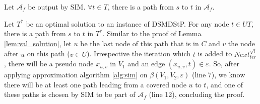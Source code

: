 \begin{Lem}
  \label{lem:terminals_covered}
  Let $\mathcal{A}_f$ be output by SIM. $\forall t \in T$, there is a path from $s$ to $t$ in $\mathcal{A}_f$.
\end{Lem}
  \begin{Proof}
    Let $T^*$ be an optimal solution to an instance of DSMDStP. For any node $t \in UT$, there is a path from $s$ to $t$ in $T^*$. Similar to the proof of Lemma \ref{lem:val_solution}, 
let $u$ be the last node of this path that is in $C$ and $v$ the node after $u$ on this path ($v \in U$). Irrespective the iteration which $t$ is added to $Next^{\sqrt{l}}_{ter}$, 
there will be a pseudo node $x_{u, v}$ in $V_1$ and an edge $(x_{u, v}, t) \in \varepsilon$. So, after applying approximation algorithm \ref{alg:sim} on $\beta(V_1, V_2, \varepsilon)$ (line 7), 
we know there will be at least one path leading from a covered node $u$ to $t$, and one of these paths is chosen by SIM to be part of $\mathcal{A}_f$ (line 12), concluding the proof.
  \end{Proof}


